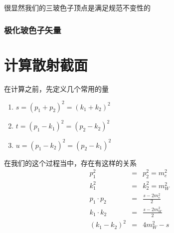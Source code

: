 \documentclass{article}
\begin{document}
很显然我们的三玻色子顶点是满足规范不变性的

\subsubsection{极化玻色子矢量}






\section{计算散射截面}
在计算之前，先定义几个常用的量
\begin{enumerate}
    \item $s = \left(p_1 + p_2\right)^2 = \left(k_1 + k_2\right)^2$
    \item $t = \left(p_1 - k_1\right)^2 = \left(p_2 - k_2\right)^2$
    \item $u = \left(p_1 - k_2\right)^2 = \left(p_2 - k_1\right)^2$
\end{enumerate}

在我们的这个过程当中，存在有这样的关系
\begin{eqnarray*}
    p_1^2 &=& p_2^2 = m_e^2 \\
    k_1^2 &=& k_2^2 = m_W^2 \\
    p_1 \cdot p_2 &=& \frac{s - 2m_e^2}{2} \\
    k_1 \cdot k_2 &=& \frac{s - 2m_W^2}{2} \\
    \left(k_1 - k_2\right)^2 &=& 4m_W^2 - s  \\
\end{eqnarray*}
\end{document}
